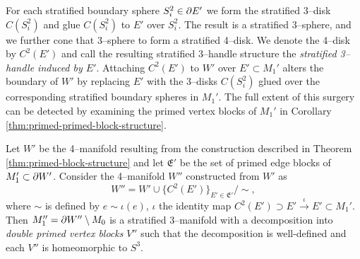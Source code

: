 For each stratified boundary sphere $S_i^2\in\partial E'$ we form the stratified 3--disk $C(S_i^2)$ and glue $C(S_i^2)$ to $E'$ over $S_i^2$.
The result is a stratified 3--sphere, and we further cone that 3--sphere to form a stratified 4--disk.
We denote the 4--disk by $C^2(E')$ and call the resulting stratified 3--handle structure the \emph{stratified 3--handle induced by $E'$}.
Attaching $C^2(E')$ to $W'$ over $E'\subset M_1'$ alters the boundary of $W'$ by replacing $E'$ with the 3--disks $C(S_i^2)$ glued over the corresponding stratified boundary spheres in $M_1'$.
The full extent of this surgery can be detected by examining the primed vertex blocks of $M_1'$ in Corollary \ref{thm:primed-primed-block-structure}.

\begin{cor}
	\label{thm:primed-primed-block-structure}
	Let $W'$ be the 4--manifold resulting from the construction described in Theorem \ref{thm:primed-block-structure} and let $\mathfrak{E}'$ be the set of primed edge blocks of $M_1'\subset\partial W'$.
	Consider the 4--manifold $W''$ constructed from $W'$ as
	\[
	W'' = W'\cup\{C^2(E')\}_{E'\in \mathfrak{E}'} / \sim,
	\]
	where $\sim$ is defined by $e\sim \iota(e)$, $\iota$ the identity map $C^2(E')\supset E'\overset{\iota}{\to} E'\subset M_1'$.
	Then $M_1''=\partial W''\setminus M_0$ is a stratified 3--manifold with a decomposition into \emph{double primed vertex blocks} $V''$ such that the decomposition is well-defined and each $V''$ is homeomorphic to $S^3$.
\end{cor}

